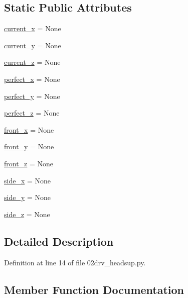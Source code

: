 \subsection*{Static Public Attributes}
\begin{DoxyCompactItemize}
\item 
\hyperlink{class02drv__headsup_1_1_data_handler_adb869357a6cf310f5b54b1d5029e058c}{current\+\_\+x} = None
\item 
\hyperlink{class02drv__headsup_1_1_data_handler_ad4d7b8fa098091aec5c4601dd19242a3}{current\+\_\+y} = None
\item 
\hyperlink{class02drv__headsup_1_1_data_handler_a6725250d984a2953d89b8a3c877985a6}{current\+\_\+z} = None
\item 
\hyperlink{class02drv__headsup_1_1_data_handler_a6abca36c6b02c13ff6fb71315182eb8b}{perfect\+\_\+x} = None
\item 
\hyperlink{class02drv__headsup_1_1_data_handler_a8ae8c0bff76bc30d236ecfea5cec7ed2}{perfect\+\_\+y} = None
\item 
\hyperlink{class02drv__headsup_1_1_data_handler_af2dafb674f19f2ed1da559c0f6de0aeb}{perfect\+\_\+z} = None
\item 
\hyperlink{class02drv__headsup_1_1_data_handler_a24184b56e000f6d9ba4fd36b1a85ff13}{front\+\_\+x} = None
\item 
\hyperlink{class02drv__headsup_1_1_data_handler_a0957f965871a95d838d3d14ffffb5cca}{front\+\_\+y} = None
\item 
\hyperlink{class02drv__headsup_1_1_data_handler_a4f8ceb052ad1c0b791bc50f97ca39ab7}{front\+\_\+z} = None
\item 
\hyperlink{class02drv__headsup_1_1_data_handler_a7b97033e8a24f63097b4fd3387a616c4}{side\+\_\+x} = None
\item 
\hyperlink{class02drv__headsup_1_1_data_handler_aa01a0cfdb2e68b636324c97f0d8799eb}{side\+\_\+y} = None
\item 
\hyperlink{class02drv__headsup_1_1_data_handler_a1698777e94d6b2847a26f28a983cb14a}{side\+\_\+z} = None
\end{DoxyCompactItemize}


\subsection{Detailed Description}


Definition at line 14 of file 02drv\+\_\+headsup.\+py.



\subsection{Member Function Documentation}
